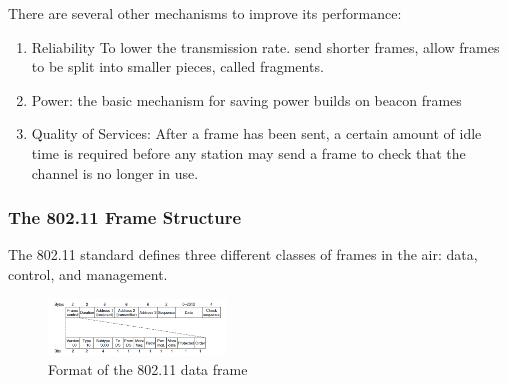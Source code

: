 There are several other mechanisms to improve its performance:
\begin{enumerate}
    \item Reliability
    \subitem To lower the transmission rate. send shorter frames, allow frames to be split into smaller pieces, called fragments. 
    \item Power: the basic mechanism for saving power builds on beacon frames
    \item Quality of Services: After a frame has been sent, a certain amount of idle time is required before any station may send a frame to check that the channel is no longer in use. 
\end{enumerate}

\subsubsection{The 802.11 Frame Structure}
The 802.11 standard defines three different classes of frames in the air: data, control, and management. 
\begin{figure}[!htb]
    \centering
    \includegraphics[width=0.42\textwidth]{pic/CN4/Format of the 802.11 data frame}
    \caption{Format of the 802.11 data frame}
\end{figure}

